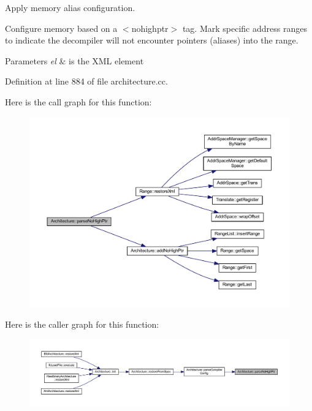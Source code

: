 Apply memory alias configuration. 

Configure memory based on a $<$nohighptr$>$ tag. Mark specific address ranges to indicate the decompiler will not encounter pointers (aliases) into the range. 
\begin{DoxyParams}{Parameters}
{\em el} & is the X\+ML element \\
\hline
\end{DoxyParams}


Definition at line 884 of file architecture.\+cc.

Here is the call graph for this function\+:
\nopagebreak
\begin{figure}[H]
\begin{center}
\leavevmode
\includegraphics[width=350pt]{class_architecture_a6f51fadb288b36927fa9dfda725ffd88_cgraph}
\end{center}
\end{figure}
Here is the caller graph for this function\+:
\nopagebreak
\begin{figure}[H]
\begin{center}
\leavevmode
\includegraphics[width=350pt]{class_architecture_a6f51fadb288b36927fa9dfda725ffd88_icgraph}
\end{center}
\end{figure}
\mbox{\label{class_architecture_a7cbe749d5bcc143838f2590fc08acf26}} 
